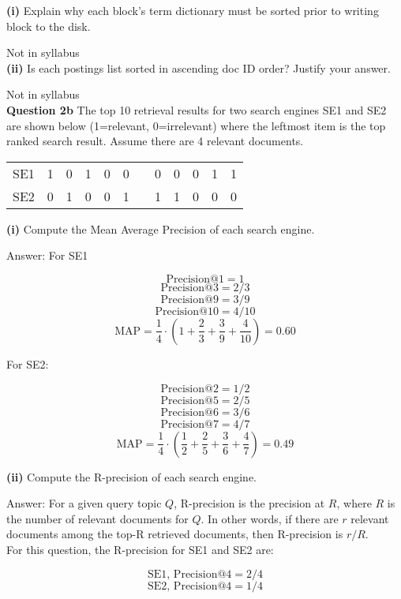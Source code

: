 \documentclass[11pt,a4paper]{report}
\begin{document}
\begin{multicols*}{2}
\noindent \textbf{(i)} Explain why each block's term dictionary must be sorted prior to writing block to the disk.

\noindent Not in syllabus\\

\noindent \textbf{(ii)} Is each postings list sorted in ascending doc ID order? Justify your answer.

\noindent Not in syllabus\\

\noindent \textbf{Question 2b} The top 10 retrieval results for two search engines SE1 and SE2 are shown below (1=relevant, 0=irrelevant) where the leftmost item is the top ranked search result. Assume there are 4 relevant documents.

\begin{center}
\begin{tabular}{ l l l l l l l l l l l l}
    SE1 & 1 & 0 & 1 & 0 & 0 &  & 0 & 0 & 0 & 1 & 1 \\
    SE2 & 0 & 1 & 0 & 0 & 1 &  & 1 & 1 & 0 & 0 & 0 \\
\end{tabular}
\end{center}

\noindent \textbf{(i)} Compute the Mean Average Precision of each search engine.

\noindent Answer: For SE1

$$\text{Precision@1}=1$$
$$\text{Precision@3}=2/3$$
$$\text{Precision@9}=3/9$$
$$\text{Precision@10}=4/10$$
$$\text{MAP} = \frac{1}{4} \cdot (1 + \frac{2}{3} + \frac{3}{9} + \frac{4}{10})= 0.60$$

\noindent For SE2:

$$\text{Precision@2}=1/2$$
$$\text{Precision@5}=2/5$$
$$\text{Precision@6}=3/6$$
$$\text{Precision@7}=4/7$$
$$\text{MAP} = \frac{1}{4} \cdot (\frac{1}{2} + \frac{2}{5} + \frac{3}{6} + \frac{4}{7}) = 0.49$$

\noindent \textbf{(ii)} Compute the R-precision of each search engine.

\noindent Answer: For a given query topic $Q$, R-precision is the precision at $R$, where $R$ is the number of relevant documents for $Q$. In other words, if there are $r$ relevant documents among the top-R retrieved documents, then R-precision is $r/R$.\\

\noindent For this question, the R-precision for SE1 and SE2 are:

$$\text{SE1, Precision@4}=2/4$$
$$\text{SE2, Precision@4}=1/4$$


\end{multicols*}
\end{document}
